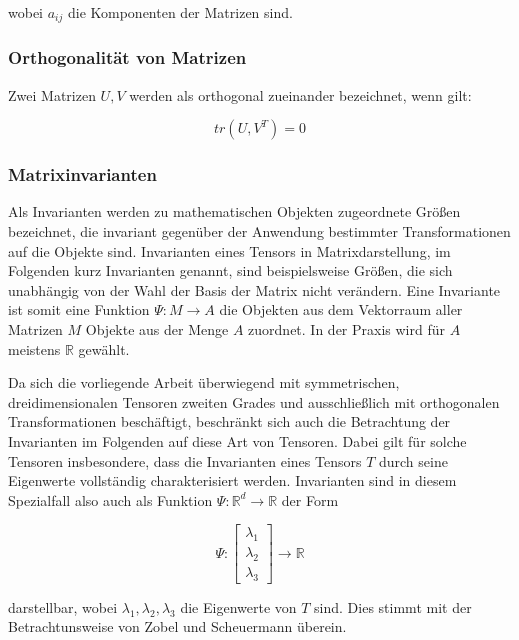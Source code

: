 \documentclass[a4paper,fontsize=12pt,toc=bib,parskip=half,ngerman]{scrartcl}
\begin{document}
wobei $a_{ij}$ die Komponenten der Matrizen sind.

\subsubsection{Orthogonalit\"at von Matrizen}
Zwei Matrizen $U,V$ werden als orthogonal zueinander bezeichnet, wenn \cite{ennis2006orthogonal} gilt:

\begin{equation}
tr(U,V^{T}) = 0
\end{equation}

\subsubsection{Matrixinvarianten}
\label{Matrixinvarianten}
Als Invarianten werden zu mathematischen Objekten zugeordnete Gr\"o{\ss}en bezeichnet, die invariant gegen\"uber der Anwendung bestimmter Transformationen auf die Objekte sind. Invarianten eines Tensors in Matrixdarstellung, im Folgenden kurz Invarianten genannt, sind beispielsweise Gr\"o{\ss}en, die sich unabh\"angig von der Wahl der Basis der Matrix nicht ver\"andern\cite{ennis2006orthogonal}. Eine Invariante ist somit eine Funktion $\Psi: M \rightarrow A$ die Objekten aus dem Vektorraum aller Matrizen $M$ Objekte aus der Menge $A$ zuordnet. In der Praxis wird f\"ur $A$ meistens $\mathbb{R}$ gew\"ahlt.

Da sich die vorliegende Arbeit \"uberwiegend mit symmetrischen, dreidimensionalen Tensoren zweiten Grades und ausschlie{\ss}lich mit orthogonalen Transformationen besch\"aftigt, beschr\"ankt sich auch die Betrachtung der Invarianten im Folgenden auf diese Art von Tensoren. Dabei gilt f\"ur solche Tensoren insbesondere, dass die Invarianten eines Tensors $T$ durch seine Eigenwerte vollst\"andig charakterisiert werden. Invarianten sind in diesem Spezialfall also auch als Funktion $\Psi: \mathbb{R}^d \rightarrow \mathbb{R}$ der Form

\begin{equation}
	\Psi:
	\begin{bmatrix}
	\lambda_1\\
	\lambda_2\\
	\lambda_3
	\end{bmatrix}
	\rightarrow \mathbb{R}
\end{equation}

darstellbar, wobei $\lambda_1, \lambda_2, \lambda_3$ die Eigenwerte von $T$ sind. Dies stimmt mit der Betrachtunsweise von Zobel und Scheuermann \cite{zobel2017extremal} \"uberein.
\end{document}
